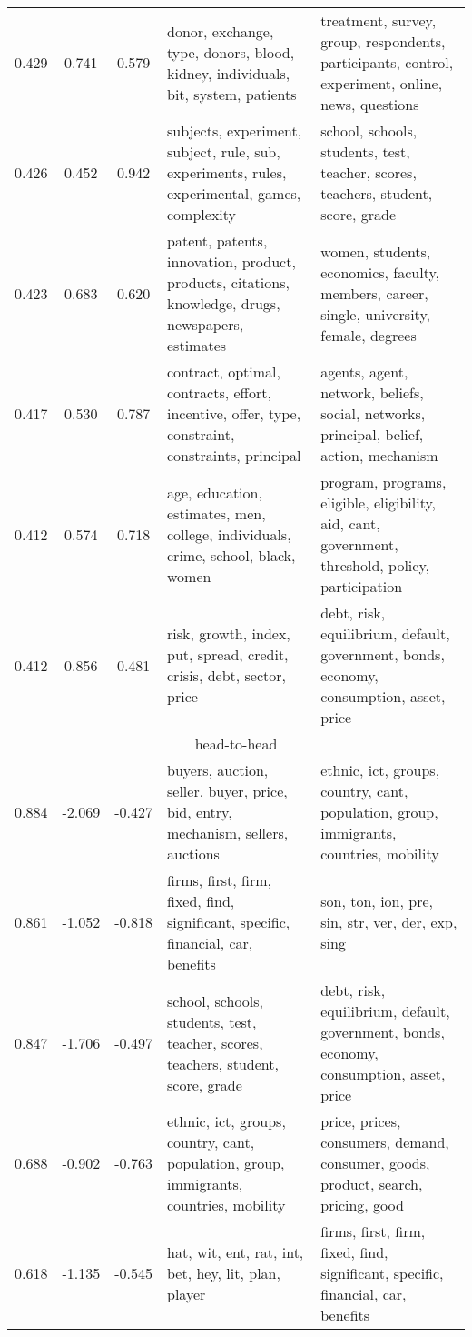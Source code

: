 \begin{tabular}{cccp{5cm}p{5cm}}
0.429 & 0.741 & 0.579 & donor, exchange, type, donors, blood, kidney, individuals, bit, system, patients & treatment, survey, group, respondents, participants, control, experiment, online, news, questions \\
0.426 & 0.452 & 0.942 & subjects, experiment, subject, rule, sub, experiments, rules, experimental, games, complexity & school, schools, students, test, teacher, scores, teachers, student, score, grade \\
0.423 & 0.683 & 0.620 & patent, patents, innovation, product, products, citations, knowledge, drugs, newspapers, estimates & women, students, economics, faculty, members, career, single, university, female, degrees \\
0.417 & 0.530 & 0.787 & contract, optimal, contracts, effort, incentive, offer, type, constraint, constraints, principal & agents, agent, network, beliefs, social, networks, principal, belief, action, mechanism \\
0.412 & 0.574 & 0.718 & age, education, estimates, men, college, individuals, crime, school, black, women & program, programs, eligible, eligibility, aid, cant, government, threshold, policy, participation \\
0.412 & 0.856 & 0.481 & risk, growth, index, put, spread, credit, crisis, debt, sector, price & debt, risk, equilibrium, default, government, bonds, economy, consumption, asset, price \\
\midrule
\multicolumn{5}{c}{head-to-head}\\
0.884 & -2.069 & -0.427 & buyers, auction, seller, buyer, price, bid, entry, mechanism, sellers, auctions & ethnic, ict, groups, country, cant, population, group, immigrants, countries, mobility \\
0.861 & -1.052 & -0.818 & firms, first, firm, fixed, find, significant, specific, financial, car, benefits & son, ton, ion, pre, sin, str, ver, der, exp, sing \\
0.847 & -1.706 & -0.497 & school, schools, students, test, teacher, scores, teachers, student, score, grade & debt, risk, equilibrium, default, government, bonds, economy, consumption, asset, price \\
0.688 & -0.902 & -0.763 & ethnic, ict, groups, country, cant, population, group, immigrants, countries, mobility & price, prices, consumers, demand, consumer, goods, product, search, pricing, good \\
0.618 & -1.135 & -0.545 & hat, wit, ent, rat, int, bet, hey, lit, plan, player & firms, first, firm, fixed, find, significant, specific, financial, car, benefits \\

\end{tabular}
